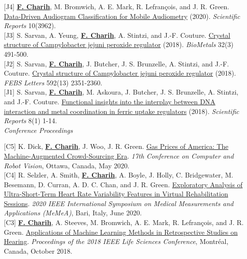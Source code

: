 \documentclass[11pt]{article}
\newcommand{\siteurl}[2]{{\href{#2}{\textcolor{quebecblue}{#1}}}}
\begin{document}
[J4] \textbf{{\underline{{F. Charih}}}}, M. Bromwich, A. E. Mark, R. Lefrançois, and J. R. Green. \siteurl{Data-Driven Audiogram Classification for Mobile Audiometry}{https://doi.org/10.1038/s41598-020-60898-3} (2020). \textit{Scientific Reports} 10(3962). \\


[J3] S. Sarvan, A. Yeung, \textbf{{\underline{{F. Charih}}}}, A. Stintzi, and J.-F. Couture. \siteurl{Crystal structure of Campylobacter jejuni peroxide regulator}{https://doi.org/10.1007/s10534-019-00177-5} (2018). \textit{BioMetals} 32(3) 491-500. \\


[J2] S. Sarvan, \textbf{{\underline{{F. Charih}}}}, J. Butcher, J. S. Brunzelle, A. Stintzi, and J.-F. Couture. \siteurl{Crystal structure of Campylobacter jejuni peroxide regulator}{https://doi.org/10.1002/1873-3468.13120} (2018). \textit{FEBS Letters} 592(13) 2351-2360. \\


[J1] S. Sarvan, \textbf{{\underline{{F. Charih}}}}, M. Askoura, J. Butcher, J. S. Brunzelle, A. Stintzi, and J.-F. Couture. \siteurl{Functional insights into the interplay between DNA interaction and metal coordination in ferric uptake regulators}{https://doi.org/10.1038/s41598-018-25157-6} (2018). \textit{Scientific Reports} 8(1) 1-14. \\


\textit{Conference Proceedings}\\

\nopagebreak

[C5] K. Dick, \textbf{{\underline{{F. Charih}}}}, J. Woo, J. R. Green. \siteurl{Gas Prices of America: The Machine-Augmented Crowd-Sourcing Era}{https://doi.org/10.1109/CRV50864.2020.00029}. \textit{17th Conference on Computer and Robot Vision}, Ottawa, Canada, May 2020.\\


[C4] R. Selzler, A. Smith, \textbf{{\underline{{F. Charih}}}}, A. Boyle, J. Holly, C. Bridgewater, M. Besemann, D. Curran, A. D. C. Chan, and J. R. Green. \siteurl{Exploratory Analysis of Ultra-Short-Term Heart Rate Variability Features in Virtual Rehabilitation Sessions}{https://doi.org/10.1109/MeMeA49120.2020.9137133}. \textit{2020 IEEE International Symposium on Medical Measurements and Applications (MeMeA)}, Bari, Italy, June 2020.\\


[C3] \textbf{{\underline{{F. Charih}}}}, A. Steeves, M. Bromwich, A. E. Mark, R. Lefrançois, and J. R. Green. \siteurl{Applications of Machine Learning Methods in Retrospective Studies on Hearing}{https://doi.org/10.1109/LSC.2018.8572268r}. \textit{Proceedings of the 2018 IEEE Life Sciences Conference}, Montréal, Canada, October 2018.\\
\end{document}
